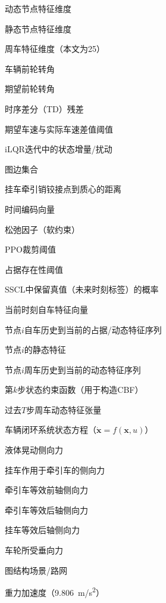 \begin{denotation}[3cm]
  \item[{$d_{\mathrm{v}}^{dyn}$}] 动态节点特征维度
  \item[{$d_{\mathrm{v}}^{stat}$}] 静态节点特征维度
  \item[$d_{veh}$] 周车特征维度（本文为25）
  \item[{$\delta$}] 车辆前轮转角
  \item[{$\delta_d$}] 期望前轮转角
  \item[{$\delta_t$}] 时序差分（TD）残差
  \item[{$\Delta v_{thrld}$}] 期望车速与实际车速差值阈值
  \item[{$\increment x_k$}] iLQR迭代中的状态增量/扰动
  \item[{$\mathcal{E}$}] 图边集合
  \item[$e$] 挂车牵引销铰接点到质心的距离
  \item[{$e_t$}] 时间编码向量
  \item[{$\epsilon$}] 松弛因子（软约束）
  \item[{$\epsilon_{clip}$}] PPO裁剪阈值
  \item[{$\epsilon_{occ}$}] 占据存在性阈值
  \item[{$\epsilon_{SSCL}$}] SSCL中保留真值（未来时刻标签）的概率
  \item[{$F_{ego}^0$}] 当前时刻自车特征向量
  \item[{$F_{i,\mathrm{ego}}^{-T+k:k}$}] 节点$i$自车历史到当前的占据/动态特征序列
  \item[{$F_{i,\mathrm{stat}}$}] 节点$i$的静态特征
  \item[{$F_{i,\mathrm{vehs}}^{-T+k:k}$}] 节点$i$周车历史到当前的动态特征序列
  \item[{$f_k^x(\cdot)$}] 第$k$步状态约束函数（用于构造CBF）
  \item[{$F_{vehs}^{-T:0}$}] 过去$T$步周车动态特征张量
  \item[{$f(\bm{x}, u)$}] 车辆闭环系统状态方程（$\dot{\bm{x}} = f(\bm{x}, u)$）
  \item[$F_y$] 液体晃动侧向力
  \item[$F_{y,int}$] 挂车作用于牵引车的侧向力
  \item[$F_{y1}$] 牵引车等效前轴侧向力
  \item[$F_{y2}$] 牵引车等效后轴侧向力
  \item[$F_{y3}$] 挂车等效后轴侧向力
  \item[$F_z$] 车轮所受垂向力
  \item[{$\mathcal{G}$}] 图结构场景/路网
  \item[$g$] 重力加速度（\SI{9.806}{m/s^2}）

\end{denotation}
